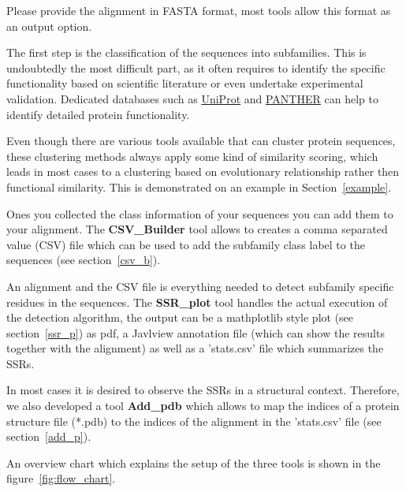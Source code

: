 \documentclass[a4paper,10pt]{article}
\begin{document}
Please provide the alignment in FASTA format, most tools allow this format as
an output option.

The first step is the classification of the sequences into subfamilies.
This is undoubtedly the most difficult part, as it often requires 
to identify the specific functionality based on scientific literature
or even undertake experimental validation. Dedicated databases such as 
\href{https://www.uniprot.org/}{UniProt} and \href{http://www.pantherdb.org/downloads/index.jsp}{PANTHER} 
can help to identify 
detailed protein functionality. 

Even though there are various tools available that can cluster protein sequences, 
these clustering methods always apply some kind of similarity scoring,
which leads in most cases to a clustering based on evolutionary relationship 
rather then functional similarity. 
This is demonstrated on an example in Section~\ref{example}.

Ones you collected the class information of your sequences you can add
them to your alignment. The \textbf{CSV\_Builder} tool allows to creates 
a comma separated value (CSV) file which can be used to add the subfamily 
class label to the sequences
(see section~\ref{csv_b}).

An alignment and the CSV file is everything needed to 
detect subfamily specific residues in the sequences. 
The \textbf{SSR\_plot} tool handles the actual execution of the detection
algorithm, the output can be a mathplotlib \cite{hunter_matplotlib:_2007} style plot (see section~\ref{ssr_p})
as pdf, a Javlview annotation file \cite{clamp_jalview_2004} (which can show the results together with the 
alignment) as well as a 'stats.csv' file which summarizes the SSRs.

In most cases it is desired to observe the SSRs in a structural context.
Therefore, we also developed a tool \textbf{Add\_pdb} which allows
to map the indices of a protein structure file (*.pdb) to the indices of the 
alignment in the 'stats.csv' file (see section~\ref{add_p}).

An overview chart which explains the setup of the three tools is shown in
the figure~\ref{fig:flow_chart}.
\end{document}

